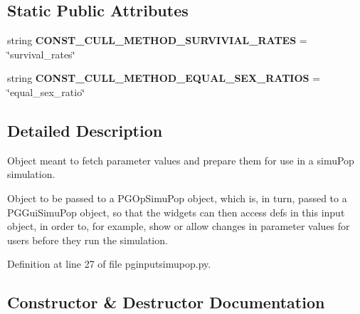 \subsection*{Static Public Attributes}
\begin{DoxyCompactItemize}
\item 
string {\bfseries C\+O\+N\+S\+T\+\_\+\+C\+U\+L\+L\+\_\+\+M\+E\+T\+H\+O\+D\+\_\+\+S\+U\+R\+V\+I\+V\+I\+A\+L\+\_\+\+R\+A\+T\+ES} = \char`\"{}survival\+\_\+rates\char`\"{}\hypertarget{classnegui_1_1pginputsimupop_1_1PGInputSimuPop_a4b5a5c2217d1929c9edffcf9e40bdcdb}{}\label{classnegui_1_1pginputsimupop_1_1PGInputSimuPop_a4b5a5c2217d1929c9edffcf9e40bdcdb}

\item 
string {\bfseries C\+O\+N\+S\+T\+\_\+\+C\+U\+L\+L\+\_\+\+M\+E\+T\+H\+O\+D\+\_\+\+E\+Q\+U\+A\+L\+\_\+\+S\+E\+X\+\_\+\+R\+A\+T\+I\+OS} = \char`\"{}equal\+\_\+sex\+\_\+ratio\char`\"{}\hypertarget{classnegui_1_1pginputsimupop_1_1PGInputSimuPop_a475049ff00dc47d34f4ceb7f507d3090}{}\label{classnegui_1_1pginputsimupop_1_1PGInputSimuPop_a475049ff00dc47d34f4ceb7f507d3090}

\end{DoxyCompactItemize}


\subsection{Detailed Description}
\begin{DoxyVerb}Object meant to fetch parameter values and prepare them for 
use in a simuPop simulation.  

Object to be passed to a PGOpSimuPop object, which is, in turn,
passed to a PGGuiSimuPop object, so that the widgets can then access
defs in this input object, in order to, for example, show or allow
changes in parameter values for users before they run the simulation.
\end{DoxyVerb}
 

Definition at line 27 of file pginputsimupop.\+py.



\subsection{Constructor \& Destructor Documentation}
